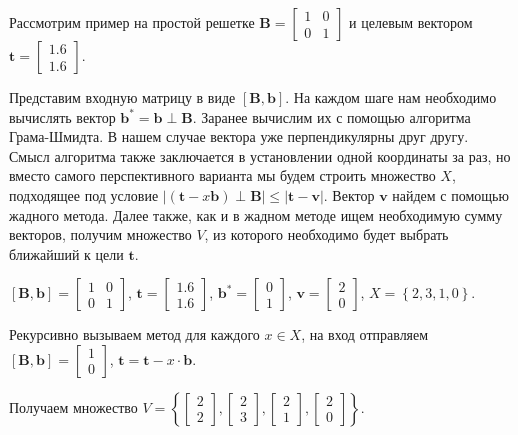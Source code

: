 Рассмотрим пример на простой решетке $ \mathbf{B} = \left[\begin{array}{cccc}
1 & 0 \\
0 & 1
\end{array}\right] $ и целевым вектором $ \mathbf{t} = \left[\begin{array}{cccc}
1.6 \\
1.6
\end{array}\right] $.

Представим входную матрицу в виде $ \left[\mathbf{B}, \mathbf{b}\right] $. На каждом шаге нам необходимо вычислять вектор $ \mathbf{b}^* = \mathbf{b} \perp \mathbf{B} $. Заранее вычислим их с помощью алгоритма Грама-Шмидта. В нашем случае вектора уже перпендикулярны друг другу. Смысл алгоритма также заключается в установлении одной координаты за раз, но вместо самого перспективного варианта мы будем строить множество $ X $, подходящее под условие $ |(\mathbf{t} - x\mathbf{b}) \perp \mathbf{B} | \leq | \mathbf{t} - \mathbf{v} | $. Вектор $ \mathbf{v} $ найдем с помощью жадного метода. Далее также, как и в жадном методе ищем необходимую сумму векторов, получим множество $ V $, из которого необходимо будет выбрать ближайший к цели $ \mathbf{t} $.

$ \left[\mathbf{B}, \mathbf{b}\right] = \left[\begin{array}{cccc}
1 & 0\\
0 & 1
\end{array}\right] $, $ \mathbf{t} = \left[\begin{array}{cccc}
1.6 \\
1.6
\end{array}\right] $, $ \mathbf{b}^* = \left[\begin{array}{cccc}
0 \\
1
\end{array}\right] $, $ \mathbf{v} = \left[\begin{array}{cccc}
2 \\ 
0
\end{array}\right] $, $ X = \left\lbrace 2, 3, 1, 0 \right\rbrace $.

Рекурсивно вызываем метод для каждого $ x \in X $, на вход отправляем $ \left[\mathbf{B}, \mathbf{b}\right] = \left[\begin{array}{cccc}
1 \\
0
\end{array}\right] $, $ \mathbf{t} = \mathbf{t} - x \cdot \mathbf{b} $.

Получаем множество $ V = \left\lbrace \left[\begin{array}{cccc}
2 \\
2
\end{array}\right], \left[\begin{array}{cccc}
2 \\
3
\end{array}\right], \left[\begin{array}{cccc}
2 \\
1
\end{array}\right], \left[\begin{array}{cccc}
2 \\
0
\end{array}\right] \right\rbrace$.

